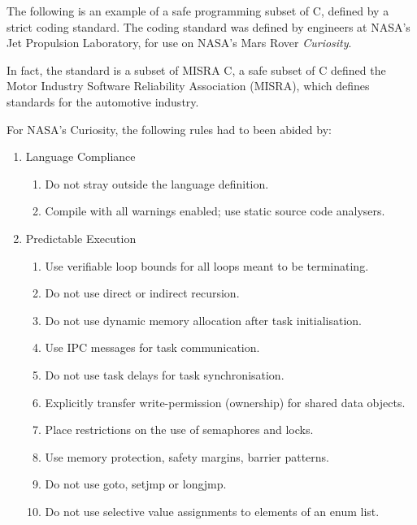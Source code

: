 \begin{example}

The following is an example of a safe programming subset of C, defined by a strict coding standard. The coding standard \cite{jpl-nasa-coding-standard09} was defined by engineers at NASA's Jet Propulsion Laboratory, for use on NASA's Mars Rover \emph{Curiosity}. 

In fact, the standard is a subset of MISRA C, a safe subset of C defined the Motor Industry Software Reliability Association (MISRA), which defines standards for the automotive industry.

For NASA's Curiosity, the following rules had to been abided by:

\begin{enumerate}

 \item Language Compliance 
  \begin{enumerate}
   \item Do not stray outside the language definition. 
  \item Compile with all warnings enabled; use static source code analysers. 
  \end{enumerate}

 \item Predictable Execution 
 \begin{enumerate}
  \item Use verifiable loop bounds for all loops meant to be terminating. 
  \item Do not use direct or indirect recursion. 
  \item Do not use dynamic memory allocation after task initialisation. 
  \item Use IPC messages for task communication. 
  \item Do not use task delays for task synchronisation. 
  \item Explicitly transfer write-permission (ownership) for shared data objects. 
  \item Place restrictions on the use of semaphores and locks. 
  \item Use memory protection, safety margins, barrier patterns. 
  \item Do not use goto, setjmp or longjmp. 
  \item Do not use selective value assignments to elements of an enum list. 
 \end{enumerate}


\end{enumerate}
\end{example}

